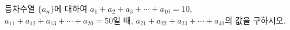 등차수열 $\{a_n\}$에 대하여 $a_1+a_2+a_3+\cdots+a_{10}=10$, $a_{11}+a_{12}+a_{13}+\cdots+a_{20}=50$일 때, $a_{21}+a_{22}+a_{23}+\cdots+a_{40}$의 값을 구하시오.

